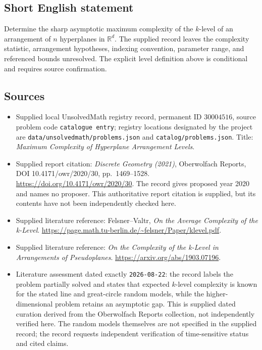 \documentclass[11pt]{article}
\newcommand{\R}{\mathbb{R}}
\begin{document}
\subsection{Short English statement}
Determine the sharp asymptotic maximum complexity of the \(k\)-level of an arrangement of \(n\) hyperplanes in \(\R^d\). The supplied record leaves the complexity statistic, arrangement hypotheses, indexing convention, parameter range, and referenced bounds unresolved. The explicit level definition above is conditional and requires source confirmation.
\subsection{Sources}
\begin{itemize}
\item Supplied local UnsolvedMath registry record, permanent ID \(30004516\), source problem code \texttt{catalogue entry}; registry locations designated by the project are \texttt{data/unsolvedmath/problems.json} and \texttt{catalog/problems.json}. Title: \emph{Maximum Complexity of Hyperplane Arrangement Levels}.
\item Supplied report citation: \emph{Discrete Geometry (2021)}, Oberwolfach Reports, DOI 10.4171/owr/2020/30, pp.\ 1469--1528. \url{https://doi.org/10.4171/owr/2020/30}. The record gives proposed year 2020 and names no proposer. This authoritative report citation is supplied, but its contents have not been independently checked here.
\item Supplied literature reference: Felsner--Valtr, \emph{On the Average Complexity of the k-Level}. \url{https://page.math.tu-berlin.de/~felsner/Paper/klevel.pdf}.
\item Supplied literature reference: \emph{On the Complexity of the k-Level in Arrangements of Pseudoplanes}. \url{https://arxiv.org/abs/1903.07196}.
\item Literature assessment dated exactly \texttt{2026-08-22}: the record labels the problem partially solved and states that expected \(k\)-level complexity is known for the stated line and great-circle random models, while the higher-dimensional problem retains an asymptotic gap. This is supplied dated curation derived from the Oberwolfach Reports collection, not independently verified here. The random models themselves are not specified in the supplied record; the record requests independent verification of time-sensitive status and cited claims.
\end{itemize}
\end{document}
